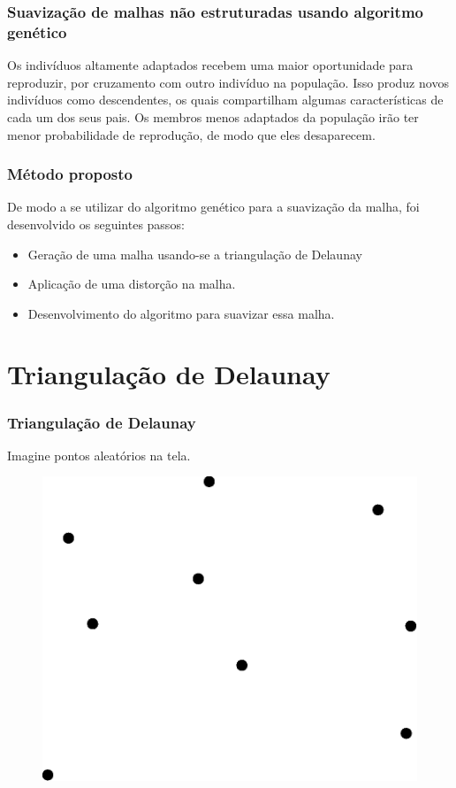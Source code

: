 \documentclass[brazil]{beamer}
\begin{document}
\begin{frame}
  \frametitle{Suavização de malhas não estruturadas usando algoritmo genético}
  Os indivíduos altamente adaptados recebem uma maior oportunidade para reproduzir, por cruzamento com outro indivíduo na população. Isso produz novos indivíduos como descendentes, os quais compartilham algumas características de cada um dos seus pais. Os membros menos adaptados da população irão ter menor probabilidade de reprodução, de modo que eles desaparecem.
\end{frame}

\begin{frame}
  \frametitle{Método proposto}

  De modo a se utilizar do algoritmo genético para a suavização da malha, foi desenvolvido os seguintes passos:

  \begin{itemize}
    \item Geração de uma malha usando-se a triangulação de Delaunay
    \item Aplicação de uma distorção na malha.
    \item Desenvolvimento do algoritmo para suavizar essa malha.
  \end{itemize}
\end{frame}

\section{Triangulação de Delaunay}

\begin{frame}
  \frametitle{Triangulação de Delaunay}
  Imagine pontos aleatórios na tela.
  \begin{figure}
    \includegraphics[width=0.5\linewidth]{dela1.eps}
  \end{figure}
\end{frame}
\end{document}
